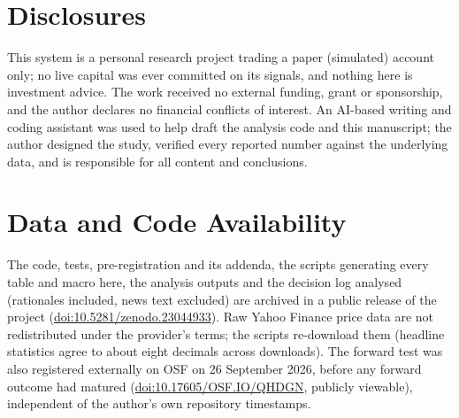 \documentclass[conference]{IEEEtran}
\begin{document}
\section*{Disclosures}
This system is a personal research project trading a paper (simulated) account only; no live capital was ever committed on its signals, and nothing here is investment advice. The work received no external funding, grant or sponsorship, and the author declares no financial conflicts of interest. An AI-based writing and coding assistant was used to help draft the analysis code and this manuscript; the author designed the study, verified every reported number against the underlying data, and is responsible for all content and conclusions.

\section*{Data and Code Availability}
The code, tests, pre-registration and its addenda, the scripts generating every table and macro here, the analysis outputs and the decision log analysed (rationales included, news text excluded) are archived in a public release of the project (\href{https://doi.org/10.5281/zenodo.23044933}{doi:10.5281/zenodo.23044933}). Raw Yahoo Finance price data are not redistributed under the provider's terms; the scripts re-download them (headline statistics agree to about eight decimals across downloads). The forward test was also registered externally on OSF on 26 September 2026, before any forward outcome had matured (\href{https://doi.org/10.17605/OSF.IO/QHDGN}{doi:10.17605/OSF.IO/QHDGN}, publicly viewable), independent of the author's own repository timestamps.




\end{document}
